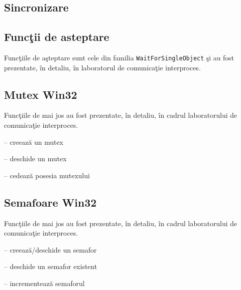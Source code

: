 \documentclass{refcard.cs.pub.ro}
\begin{document}
\begin{multicols*}{3}
\section{Sincronizare}

\subsection{Funcţii de asteptare}

Funcţiile de aşteptare sunt cele din familia \texttt{WaitForSingleObject} şi au fost prezentate, în detaliu, în laboratorul de comunicaţie interproces.

\subsection{Mutex Win32}

Funcţiile de mai jos au fost prezentate, în detaliu, în cadrul laboratorului de comunicaţie interproces.

 -- creează un mutex

 -- deschide un mutex

 -- cedează posesia mutexului

\subsection{Semafoare Win32}

Funcţiile de mai jos au fost prezentate, în detaliu, în cadrul laboratorului de comunicaţie interproces.

 -- creează/deschide un semafor

 -- deschide un semafor existent

 -- incrementează semaforul
 

\end{multicols*}
\end{document}
